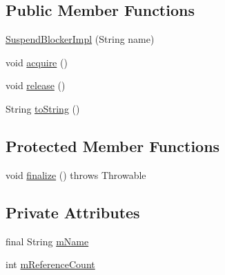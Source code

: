 \subsection*{Public Member Functions}
\begin{DoxyCompactItemize}
\item 
\hyperlink{classcom_1_1android_1_1server_1_1power_1_1PowerManagerService_1_1SuspendBlockerImpl_abf24bf890702266e6eebca8423861533}{Suspend\-Blocker\-Impl} (String name)
\item 
void \hyperlink{classcom_1_1android_1_1server_1_1power_1_1PowerManagerService_1_1SuspendBlockerImpl_a205d4c45331cdccd19f68f16fc868747}{acquire} ()
\item 
void \hyperlink{classcom_1_1android_1_1server_1_1power_1_1PowerManagerService_1_1SuspendBlockerImpl_a50ee9f2e09fb241a05bb8e06c22da75f}{release} ()
\item 
String \hyperlink{classcom_1_1android_1_1server_1_1power_1_1PowerManagerService_1_1SuspendBlockerImpl_a012dabeda4d789416c899c9d214a6545}{to\-String} ()
\end{DoxyCompactItemize}
\subsection*{Protected Member Functions}
\begin{DoxyCompactItemize}
\item 
void \hyperlink{classcom_1_1android_1_1server_1_1power_1_1PowerManagerService_1_1SuspendBlockerImpl_ae929111412e50bea98168ed8275c38ad}{finalize} ()  throws Throwable 
\end{DoxyCompactItemize}
\subsection*{Private Attributes}
\begin{DoxyCompactItemize}
\item 
final String \hyperlink{classcom_1_1android_1_1server_1_1power_1_1PowerManagerService_1_1SuspendBlockerImpl_ad501d117f4f5989024a31c850c20bf1d}{m\-Name}
\item 
int \hyperlink{classcom_1_1android_1_1server_1_1power_1_1PowerManagerService_1_1SuspendBlockerImpl_a4207d453531a0b152c612f21179ffc79}{m\-Reference\-Count}
\end{DoxyCompactItemize}


